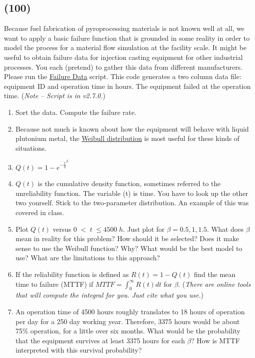\documentclass[11pt,a4paper]{article}
\begin{document}
\subsection*{(100)}
Because fuel fabrication of pyroprocessing materials is not known well at all, we want to apply a basic failure function that is grounded in some reality in order to model the process for a material flow simulation at the facility scale. It might be useful to obtain failure data for injection casting equipment for other industrial processes.  You each (pretend) to gather this data from different manufacturers. Please run the \href{https://github.com/TheDoctorRAB/education/tree/master/src}{Failure Data} script. This code generates a two column data file: equipment ID and operation time in hours. The equipment failed at the operation time. (\textit{Note -- Script is in v2.7.0.})
\begin{enumerate}
    \item Sort the data. Compute the failure rate.
    \item Because not much is known about how the equipment will behave with liquid plutonium metal, the \href{https://uidaho.pressbooks.pub/riskassessment/chapter/failure-rates/}{Weibull distribution} is most useful for these kinds of situations.
    \item $Q(t) = 1 - e^{-\frac{t}{\eta}^{\beta}}$
    \item $Q(t)$ is the cumulative density function, sometimes referred to the unreliability function. The variable (t) is time. You have to look up the other two yourself. Stick to the two-parameter distribution. An example of this was covered in class.
    \item Plot $Q(t)$ versus $0 \; < \; t \; \leq 4500 \; h$. Just plot for $\beta = 0.5, 1, 1.5$. What does $\beta$  mean in reality for this problem? How should it be selected? Does it make sense to use the Weibull function? Why? What would be the best model to use? What are the limitations to this approach?
    \item If the reliability function is defined as $R(t) = 1 - Q(t)$ find the mean time to failure (MTTF) if $MTTF=\int_0^{\infty} R(t) dt$ for $\beta$. (\textit{There are online tools that will compute the integral for you. Just cite what you use.})
    \item An operation time of 4500 hours roughly translates to 18 hours of operation per day for a 250 day working year. Therefore, 3375 hours would be about 75\% operation, for a little over six months. What would be the probability that the equipment survives at least 3375 hours for each $\beta$? How is MTTF interpreted with this survival probability?
\end{enumerate}
\end{document}
